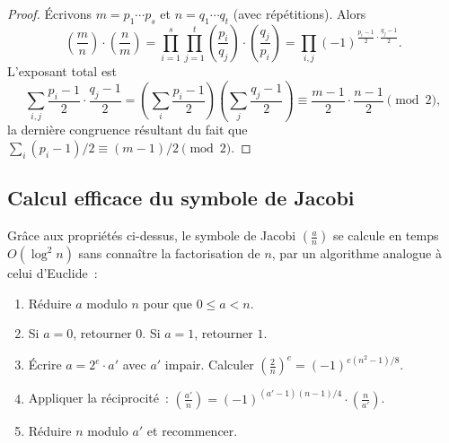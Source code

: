 \documentclass[12pt,a4paper,openany]{book}
\theoremstyle{definition}
\theoremstyle{plain}
\theoremstyle{remark}
\newcommand{\legendre}[2]{\left(\frac{#1}{#2}\right)}
\newcommand{\jacobi}[2]{\left(\frac{#1}{#2}\right)}
\begin{document}
\begin{proof}
Écrivons $m = p_1 \cdots p_s$ et $n = q_1 \cdots q_t$ (avec répétitions).
Alors
\[
  \jacobi{m}{n} \cdot \jacobi{n}{m}
  = \prod_{i=1}^{s} \prod_{j=1}^{t} \legendre{p_i}{q_j} \cdot \legendre{q_j}{p_i}
  = \prod_{i,j} (-1)^{\frac{p_i - 1}{2} \cdot \frac{q_j - 1}{2}}.
\]
L'exposant total est
\[
  \sum_{i,j} \frac{p_i - 1}{2} \cdot \frac{q_j - 1}{2}
  = \left(\sum_{i} \frac{p_i - 1}{2}\right) \left(\sum_{j} \frac{q_j - 1}{2}\right)
  \equiv \frac{m-1}{2} \cdot \frac{n-1}{2} \pmod{2},
\]
la dernière congruence résultant du fait que
$\sum_i (p_i - 1)/2 \equiv (m-1)/2 \pmod{2}$.
\end{proof}

\subsection{Calcul efficace du symbole de Jacobi}
\label{subsec:qr:jacobi-algorithme}

Grâce aux propriétés ci-dessus, le symbole de Jacobi $\jacobi{a}{n}$ se calcule
en temps $O(\log^2 n)$ sans connaître la factorisation de $n$, par un algorithme
analogue à celui d'Euclide~:

\begin{enumerate}[label=\textbf{Étape~\arabic*.}]
  \item Réduire $a$ modulo $n$ pour que $0 \leq a < n$.
  \item Si $a = 0$, retourner $0$. Si $a = 1$, retourner $1$.
  \item Écrire $a = 2^e \cdot a'$ avec $a'$ impair. Calculer
        $\jacobi{2}{n}^e = (-1)^{e(n^2-1)/8}$.
  \item Appliquer la réciprocité~: $\jacobi{a'}{n} = (-1)^{(a'-1)(n-1)/4} \cdot \jacobi{n}{a'}$.
  \item Réduire $n$ modulo $a'$ et recommencer.
\end{enumerate}
\end{document}
